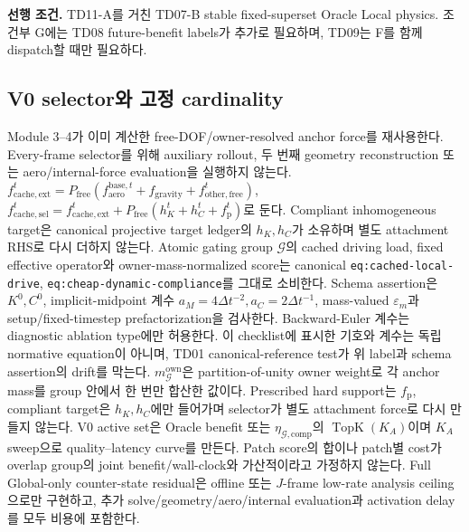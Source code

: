 \documentclass[10pt,a4paper]{article}
\newcommand{\code}[1]{\texttt{#1}}
\begin{document}
\textbf{선행 조건.} TD11-A를 거친 TD07-B stable fixed-superset Oracle Local physics.
조건부 G에는 TD08 future-benefit labels가 추가로 필요하며, TD09는 F를 함께 dispatch할 때만 필요하다.

\subsection*{V0 selector와 고정 cardinality}

Module 3--4가 이미 계산한 free-DOF/owner-resolved anchor force를 재사용한다.
Every-frame selector를 위해 auxiliary rollout, 두 번째 geometry reconstruction 또는
aero/internal-force evaluation을 실행하지 않는다.
\(f_{\mathrm{cache,ext}}^t=P_{\mathrm{free}}
  (f_{\mathrm{aero}}^{\mathrm{base},t}+f_{\mathrm{gravity}}+f_{\mathrm{other,free}}^t
  )\),
\(f_{\mathrm{cache,sel}}^t=f_{\mathrm{cache,ext}}^t
  +P_{\mathrm{free}}(h_K^t+h_C^t+f_{\mathrm p}^t)\)로 둔다.
Compliant inhomogeneous target은 canonical projective target ledger의 \(h_K,h_C\)가 소유하며
별도 attachment RHS로 다시 더하지 않는다.
Atomic gating group \(\mathcal G\)의 cached driving load, fixed effective operator와
owner-mass-normalized score는 canonical
\code{eq:cached-local-drive}, \code{eq:cheap-dynamic-compliance}를 그대로 소비한다.
Schema assertion은 \(K^0,C^0\), implicit-midpoint 계수
\(a_M=4\Delta t^{-2},a_C=2\Delta t^{-1}\), mass-valued \(\varepsilon_m\)과
setup/fixed-timestep prefactorization을 검사한다. Backward-Euler 계수는 diagnostic ablation type에만
허용한다. 이 checklist에 표시한 기호와 계수는 독립 normative equation이 아니며,
TD01 canonical-reference test가 위 label과 schema assertion의 drift를 막는다.
\(m_{\mathcal G}^{\mathrm{own}}\)은 partition-of-unity owner weight로 각 anchor mass를
group 안에서 한 번만 합산한 값이다.
Prescribed hard support는 \(f_{\mathrm p}\), compliant target은 \(h_K,h_C\)에만 들어가며
selector가 별도 attachment force로 다시 만들지 않는다.
V0 active set은 Oracle benefit 또는 \(\eta_{\mathcal G,\mathrm{comp}}\)의
\(\operatorname{TopK}(K_A)\)이며 \(K_A\) sweep으로 quality--latency curve를 만든다.
Patch score의 합이나 patch별 cost가 overlap group의 joint benefit/wall-clock와 가산적이라고 가정하지 않는다.
Full Global-only counter-state residual은 offline 또는 \(J\)-frame low-rate analysis ceiling으로만 구현하고,
추가 solve/geometry/aero/internal evaluation과 activation delay를 모두 비용에 포함한다.
\end{document}

